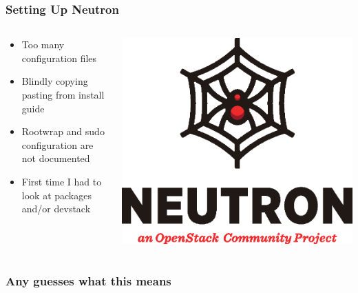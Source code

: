 \documentclass[aspectratio=169,11pt,hyperref={colorlinks=true}]{beamer}
\begin{document}
\begin{frame}
    \frametitle{Setting Up Neutron}
    \begin{columns}[T]
        \begin{column}{.48\textwidth}
            \begin{itemize}
                \item Too many configuration files
                \item Blindly copying pasting from install guide
                \item Rootwrap and sudo configuration are not documented
                \item First time I had to look at packages and/or devstack
            \end{itemize}
        \end{column}
        \begin{column}{.48\textwidth}
            \includegraphics[width=\textwidth]{mascots/neutron.eps}
        \end{column}
    \end{columns}
\end{frame}

\begin{frame}
    \frametitle{Any guesses what this means}
    
\end{frame}
\end{document}
